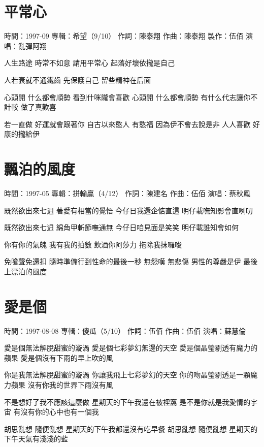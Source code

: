 \documentclass[UTF8,a4paper,oneside,twocolumn,12pt]{ctexbook}
\newcommand{\infopair}[2]{\textbullet #1：#2}
\newcommand{\zc}[1][伍佰]{\infopair{作詞}{#1}}
\newcommand{\zq}[1][伍佰]{\infopair{作曲}{#1}}
\newcommand{\zj}[1]{\infopair{專輯}{#1}}
\newcommand{\zz}[1]{\infopair{製作}{#1}}
\newcommand{\sj}[1]{\infopair{時間}{#1}}
\newenvironment{info}{\begin{flushleft}\kaishu
	}
	{\end{flushleft}\normalsize\yahei\par}
\newenvironment{lyric}{
	}
{}
\begin{document}
\section{平常心}
\begin{info}
	\sj{1997-09}
	\zj{希望（9/10）}
	\zc[陳泰翔]
	\zq[陳泰翔]
	\zz{伍佰}
	\infopair{演唱}{亂彈阿翔}
\end{info}
\begin{lyric}
	人生路途 時常不如意 請用平常心
	起落好壞依攏是自己

	人若衰就不通鐵齒 先保護自己
	留些精神在后面

	心頭開 什么都會順勢
	看到什咪隴會喜歡
	心頭開 什么都會順勢
	有什么代志讓你不計較 做了真歡喜

	若一直做 好運就會跟著你
	自古以來憨人 有憨福
	因為伊不會去說是非 人人喜歡
	好康的攏給伊
\end{lyric}

\section{飄泊的風度}
\begin{info}
	\sj{1997-05}
	\zj{拼輸贏（4/12）}
	\zc[陳建名]
	\zq
	\infopair{演唱}{蔡秋鳳}
\end{info}
\begin{lyric}
	既然欲出來七迌 著愛有相當的覺悟
	今仔日我還企惦直這 明仔載嘸知影會直咧叨

	既然欲出來七迌 綿角甲斬節嘸通無
	今仔日咱見面是笑笑 明仔載誰知會如何

	你有你的氣魄 我有我的拍數
	飲酒你阿莎力 拖除我抹囉唆

	免嗆聲免還扣 隨時準備行到性命的最後一秒
	無怨嘆 無悲傷
	男性的尊嚴是伊 最後上漂泊的風度
\end{lyric}

\section{愛是個}
\begin{info}
	\sj{1997-08-08}
	\zj{傻瓜（5/10）}
	\zc
	\zq
	\infopair{演唱}{蘇慧倫}
\end{info}
\begin{lyric}
	愛是個無法解脫甜蜜的漩渦
	愛是個七彩夢幻無邊的天空
	愛是個晶瑩剔透有魔力的蘋果
	愛是個沒有下雨的早上吹的風

	你是我無法解脫甜蜜的漩渦
	你讓我飛上七彩夢幻的天空
	你的吻晶瑩剔透是一顆魔力蘋果
	沒有你我的世界下雨沒有風

	不是想好了我不應該這麼做
	星期天的下午我還在被裡窩
	是不是你就是我愛情的宇宙
	有沒有你的心中也有一個我

	胡思亂想 隨便亂想 星期天的下午我都還沒有吃早餐
	胡思亂想 隨便亂想 星期天的下午天氣有淺淺的藍
\end{lyric}
\end{document}
